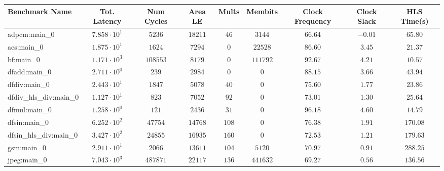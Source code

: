 \begin{tabular}{|l|c|c|c|c|c|c|c|c|}
\hline
Benchmark Name          & Tot. Latency           & Num Cycles & Area LE    & Mults   & Membits    & Clock Frequency & Clock Slack & HLS Time(s) \\
\hline
adpcm:main\_0           & $ 7.858 \cdot 10^{1} $ & $ 5236   $ & $ 18211  $ & $ 46  $ & $ 3144   $ & $ 66.64       $ & $ -0.01   $ & $ 65.80   $ \\
aes:main\_0             & $ 1.875 \cdot 10^{1} $ & $ 1624   $ & $ 7294   $ & $ 0   $ & $ 22528  $ & $ 86.60       $ & $ 3.45    $ & $ 21.37   $ \\
bf:main\_0              & $ 1.171 \cdot 10^{3} $ & $ 108553 $ & $ 8179   $ & $ 0   $ & $ 111792 $ & $ 92.67       $ & $ 4.21    $ & $ 10.57   $ \\
dfadd:main\_0           & $ 2.711 \cdot 10^{0} $ & $ 239    $ & $ 2984   $ & $ 0   $ & $ 0      $ & $ 88.15       $ & $ 3.66    $ & $ 43.94   $ \\
dfdiv:main\_0           & $ 2.443 \cdot 10^{1} $ & $ 1847   $ & $ 5078   $ & $ 40  $ & $ 0      $ & $ 75.60       $ & $ 1.77    $ & $ 23.86   $ \\
dfdiv\_hls\_div:main\_0 & $ 1.127 \cdot 10^{1} $ & $ 823    $ & $ 7052   $ & $ 92  $ & $ 0      $ & $ 73.01       $ & $ 1.30    $ & $ 25.64   $ \\
dfmul:main\_0           & $ 1.258 \cdot 10^{0} $ & $ 121    $ & $ 2436   $ & $ 31  $ & $ 0      $ & $ 96.18       $ & $ 4.60    $ & $ 14.79   $ \\
dfsin:main\_0           & $ 6.252 \cdot 10^{2} $ & $ 47754  $ & $ 14768  $ & $ 108 $ & $ 0      $ & $ 76.38       $ & $ 1.91    $ & $ 170.08  $ \\
dfsin\_hls\_div:main\_0 & $ 3.427 \cdot 10^{2} $ & $ 24855  $ & $ 16935  $ & $ 160 $ & $ 0      $ & $ 72.53       $ & $ 1.21    $ & $ 179.63  $ \\
gsm:main\_0             & $ 2.911 \cdot 10^{1} $ & $ 2066   $ & $ 13611  $ & $ 104 $ & $ 5120   $ & $ 70.97       $ & $ 0.91    $ & $ 288.25  $ \\
jpeg:main\_0            & $ 7.043 \cdot 10^{3} $ & $ 487871 $ & $ 22117  $ & $ 136 $ & $ 441632 $ & $ 69.27       $ & $ 0.56    $ & $ 136.56  $ \\

\end{tabular}
